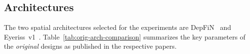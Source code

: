 \subsection{Architectures}
\label{sec:architectures}

The two spatial architectures selected for the experiments are
DepFiN~\cite{goetschalckx2023depfin} and Eyeriss~v1~\cite{eyeriss}.
Table~\ref{tab:orig-arch-comparison} summarizes the key parameters of the
\emph{original} designs as published in the respective papers.

